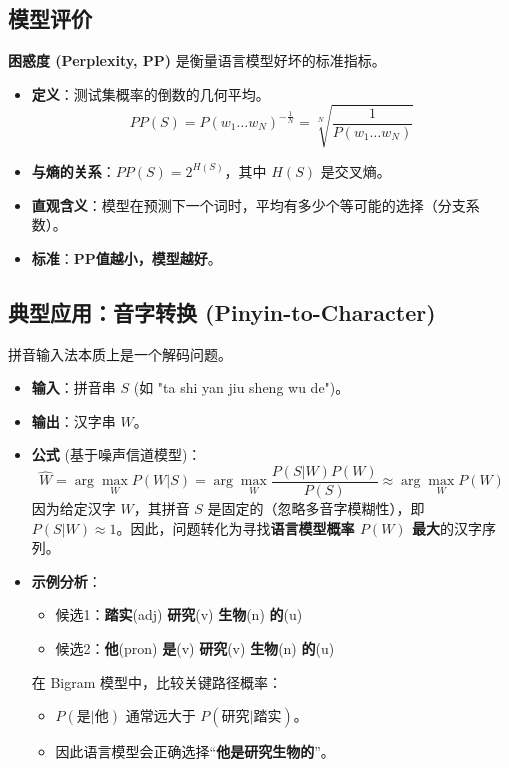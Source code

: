 \documentclass[a4paper, 11pt]{ctexart}
\begin{document}
\subsection{模型评价}
\textbf{困惑度 (Perplexity, PP)} 是衡量语言模型好坏的标准指标。
\begin{itemize}
    \item \textbf{定义}：测试集概率的倒数的几何平均。
    \begin{equation}
        PP(S) = P(w_1 \dots w_N)^{-\frac{1}{N}} = \sqrt[N]{\frac{1}{P(w_1 \dots w_N)}}
    \end{equation}
    \item \textbf{与熵的关系}：$PP(S) = 2^{H(S)}$，其中 $H(S)$ 是交叉熵。
    \item \textbf{直观含义}：模型在预测下一个词时，平均有多少个等可能的选择（分支系数）。
    \item \textbf{标准}：\textbf{PP值越小，模型越好}。
\end{itemize}

\subsection{典型应用：音字转换 (Pinyin-to-Character)}
拼音输入法本质上是一个解码问题。
\begin{itemize}
    \item \textbf{输入}：拼音串 $S$ (如 "ta shi yan jiu sheng wu de")。
    \item \textbf{输出}：汉字串 $W$。
    \item \textbf{公式} (基于噪声信道模型)：
    $$ \hat{W} = \arg\max_W P(W|S) = \arg\max_W \frac{P(S|W) P(W)}{P(S)} \approx \arg\max_W P(W) $$
    因为给定汉字 $W$，其拼音 $S$ 是固定的（忽略多音字模糊性），即 $P(S|W) \approx 1$。因此，问题转化为寻找\textbf{语言模型概率 $P(W)$ 最大}的汉字序列。
    \item \textbf{示例分析}：
    \begin{itemize}
        \item 候选1：\textbf{踏实}(adj) \textbf{研究}(v) \textbf{生物}(n) \textbf{的}(u)
        \item 候选2：\textbf{他}(pron) \textbf{是}(v) \textbf{研究}(v) \textbf{生物}(n) \textbf{的}(u)
    \end{itemize}
    在 Bigram 模型中，比较关键路径概率：
    \begin{itemize}
        \item $P(\text{是}|\text{他})$ 通常远大于 $P(\text{研究}|\text{踏实})$。
        \item 因此语言模型会正确选择“\textbf{他是研究生物的}”。
    \end{itemize}
\end{itemize}
\newpage
\end{document}
